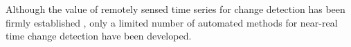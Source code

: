 \documentclass[authoryear,preprint,review,10pt]{elsarticle}
\newcommand{\readme}[1]{\emph{\marginpar{README} (#1)}}
\begin{document}
Although the value of remotely sensed time series for change detection has been
firmly established \citep{deBeurs:2005jq, Verbesselt2009a}, only a limited
number of automated methods for near-real time change detection have been
developed. 

%	
%	
%	
\end{document}
